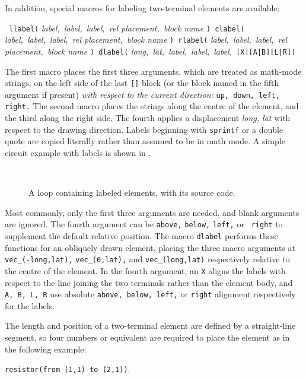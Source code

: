    In addition, special macros for labeling two-terminal elements are available:
\par
{\tt
   llabel(} {\sl label,\ label,\ label,\ rel placement,\ block name} {\tt )
      \hfill\break\hspace*{\parindent}%
   clabel(} {\sl label,\ label,\ label,\ rel placement,\ block name} {\tt )
      \hfill\break\hspace*{\parindent}%
   rlabel(} {\sl label,\ label,\ label,\ rel placement,\ block name} {\tt )
      \hfill\break\hspace*{\parindent}%
   dlabel(} {\sl long,\ lat,\ label,\ label,\ label,\ }{\tt[X][A|B][L|R])}

The first macro places the first three arguments, which are treated
as math-mode strings, on the left side of the last {\tt []} block (or
the block named in the fifth argument if present) {\em with respect to
the current direction:} {\tt up, down, left, right.} The second macro
places the strings along the centre of the element, and the third along
the right side.  The fourth applies a displacement {\sl long, lat} with
respect to the drawing direction.  Labels beginning with {\tt sprintf}
or a double quote are copied literally rather than assumed to be in
math mode.  A simple circuit example with labels is shown in .
\begin{figure}[H]
   \vspace*{-\baselineskip}
   \parbox{4in}{\small }%
   \hfill\raise-0.5in\hbox{ }
   \vspace*{-\baselineskip}
   \caption{A loop containing labeled elements, with its source code.}
   \label{Loop}
   \end{figure}
Most commonly, only
the first three arguments are needed, and blank arguments are ignored.
The fourth argument can be {\tt above,} {\tt below,} {\tt left,} or {\tt
right} to supplement the default relative position.
The macro {\tt dlabel} performs these functions for an
obliquely drawn element, placing the three macro arguments at
{\tt vec\_(-long,lat),} {\tt vec\_(0,lat),} and {\tt vec\_(long,lat)}
respectively relative to the centre of the element.
In the fourth argument, an {\tt X} aligns the labels with respect to the line
joining the two terminals rather than the element body, and
{\tt A, B, L, R} use absolute {\tt above, below, left,} or {\tt right} alignment
respectively for the labels.

The length and position of a two-terminal element
are defined by a straight-line segment, so
four numbers or equivalent
are required to place the element as in the following example:
\par
{\tt resistor(from (1,1) to (2,1))}.


